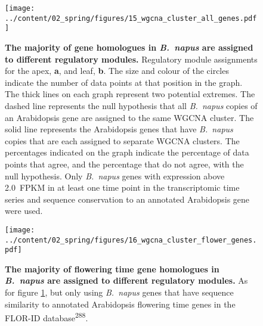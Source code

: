 \documentclass[12pt,]{book}
\begin{document}
\begin{figure}[htbp]
\centering
\texttt{[image: ../content/02\_spring/figures/15\_wgcna\_cluster\_all\_genes.pdf]}
\caption{\textbf{The majority of gene homologues in \emph{B.~napus} are
assigned to different regulatory modules.} Regulatory module assignments
for the apex, \textbf{a}, and leaf, \textbf{b}. The size and colour of
the circles indicate the number of data points at that position in the
graph. The thick lines on each graph represent two potential extremes.
The dashed line represents the null hypothesis that all \emph{B.~napus}
copies of an Arabidopsis gene are assigned to the same WGCNA cluster.
The solid line represents the Arabidopsis genes that have
\emph{B.~napus} copies that are each assigned to separate WGCNA
clusters. The percentages indicated on the graph indicate the percentage
of data points that agree, and the percentage that do not agree, with
the null hypothesis. Only \emph{B.~napus} genes with expression above
2.0~FPKM in at least one time point in the transcriptomic time series
and sequence conservation to an annotated Arabidopsis gene were
used.}\label{figure:215:wgcnaall}
\end{figure}

\begin{figure}[htbp]
\centering
\texttt{[image: ../content/02\_spring/figures/16\_wgcna\_cluster\_flower\_genes.pdf]}
\caption{\textbf{The majority of flowering time gene homologues in
\emph{B.~napus} are assigned to different regulatory modules.} As for
figure \ref{figure:215:wgcnaall}, but only using \emph{B.~napus} genes
that have sequence similarity to annotated Arabidopsis flowering time
genes in the FLOR-ID
database\textsuperscript{288}.}\label{figure:216:wgcnaflower}
\end{figure}
\end{document}
